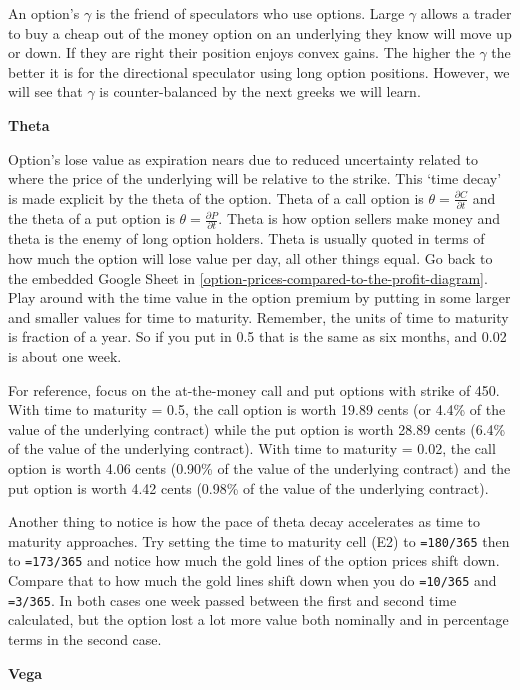 \documentclass[
]{book}
\begin{document}
An option's \(\gamma\) is the friend of speculators who use options. Large \(\gamma\) allows a trader to buy a cheap out of the money option on an underlying they know will move up or down. If they are right their position enjoys convex gains. The higher the \(\gamma\) the better it is for the directional speculator using long option positions. However, we will see that \(\gamma\) is counter-balanced by the next greeks we will learn.

\textbf{Theta}

Option's lose value as expiration nears due to reduced uncertainty related to where the price of the underlying will be relative to the strike. This `time decay' is made explicit by the theta of the option. Theta of a call option is \(\theta = \frac{\partial C}{\partial t}\) and the theta of a put option is \(\theta = \frac{\partial P}{\partial t}\). Theta is how option sellers make money and theta is the enemy of long option holders. Theta is usually quoted in terms of how much the option will lose value per day, all other things equal. Go back to the embedded Google Sheet in \ref{option-prices-compared-to-the-profit-diagram}. Play around with the time value in the option premium by putting in some larger and smaller values for time to maturity. Remember, the units of time to maturity is fraction of a year. So if you put in 0.5 that is the same as six months, and 0.02 is about one week.

For reference, focus on the at-the-money call and put options with strike of 450. With time to maturity = 0.5, the call option is worth 19.89 cents (or 4.4\% of the value of the underlying contract) while the put option is worth 28.89 cents (6.4\% of the value of the underlying contract). With time to maturity = 0.02, the call option is worth 4.06 cents (0.90\% of the value of the underlying contract) and the put option is worth 4.42 cents (0.98\% of the value of the underlying contract).

Another thing to notice is how the pace of theta decay accelerates as time to maturity approaches. Try setting the time to maturity cell (E2) to \texttt{=180/365} then to \texttt{=173/365} and notice how much the gold lines of the option prices shift down. Compare that to how much the gold lines shift down when you do \texttt{=10/365} and \texttt{=3/365}. In both cases one week passed between the first and second time calculated, but the option lost a lot more value both nominally and in percentage terms in the second case.

\textbf{Vega}
\end{document}
